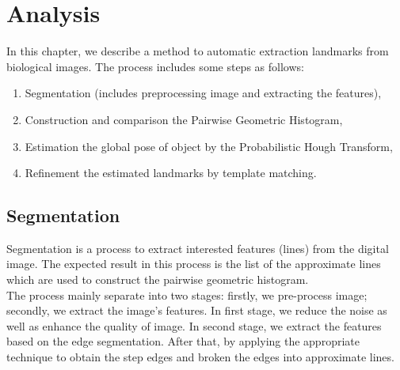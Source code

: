 \chapter{Analysis}
In this chapter, we describe a method to automatic extraction landmarks from biological images. The process includes some steps as follows:
\begin{enumerate}
\item Segmentation (includes preprocessing image and extracting the features),
\item Construction and comparison the Pairwise Geometric Histogram,
\item Estimation the global pose of object by the Probabilistic Hough Transform,
\item Refinement the estimated landmarks by template matching.
\end{enumerate}
\section{Segmentation}
Segmentation is a process to extract interested features (lines) from the digital image. The expected result in this process is the list of the approximate lines which are used to construct the pairwise geometric histogram. \\[0.2cm]
The process mainly separate into two stages: firstly, we pre-process image; secondly, we extract the image's features. In first stage, we reduce the noise as well as enhance the quality of image. In second stage, we extract the features based on the edge segmentation. After that, by applying the appropriate technique to obtain the step edges and broken the edges into approximate lines.
